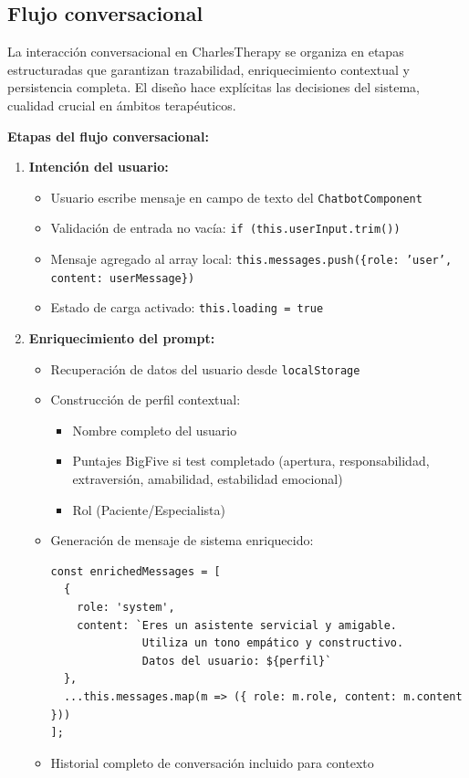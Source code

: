 \documentclass[12pt,a4paper]{report}
\numberwithin{figure}{section}
\begin{document}
\subsection{Flujo conversacional}
\label{subsec:flujo_conversacional}

La interacción conversacional en CharlesTherapy se organiza en etapas estructuradas que garantizan trazabilidad, enriquecimiento contextual y persistencia completa. El diseño hace explícitas las decisiones del sistema, cualidad crucial en ámbitos terapéuticos.

\textbf{Etapas del flujo conversacional:}

\begin{enumerate}
  \item \textbf{Intención del usuario:}
  \begin{itemize}
    \item Usuario escribe mensaje en campo de texto del \texttt{ChatbotComponent}
    \item Validación de entrada no vacía: \texttt{if (this.userInput.trim())}
    \item Mensaje agregado al array local: \texttt{this.messages.push(\{role: 'user', content: userMessage\})}
    \item Estado de carga activado: \texttt{this.loading = true}
  \end{itemize}
  
  \item \textbf{Enriquecimiento del prompt:}
  \begin{itemize}
    \item Recuperación de datos del usuario desde \texttt{localStorage}
    \item Construcción de perfil contextual:
    \begin{itemize}
      \item Nombre completo del usuario
      \item Puntajes BigFive si test completado (apertura, responsabilidad, extraversión, amabilidad, estabilidad emocional)
      \item Rol (Paciente/Especialista)
    \end{itemize}
    \item Generación de mensaje de sistema enriquecido:
    \begin{lstlisting}[style=angelcode]
const enrichedMessages = [
  { 
    role: 'system', 
    content: `Eres un asistente servicial y amigable. 
              Utiliza un tono empático y constructivo. 
              Datos del usuario: ${perfil}` 
  },
  ...this.messages.map(m => ({ role: m.role, content: m.content }))
];
    \end{lstlisting}
    \item Historial completo de conversación incluido para contexto
  \end{itemize}
  

\end{enumerate}
\end{document}
